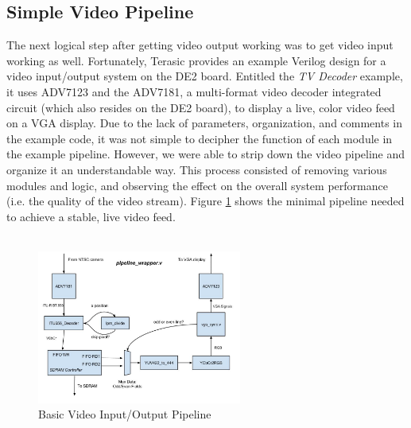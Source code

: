\documentclass[11pt]{article} %
\begin{document}
\subsection{Simple Video Pipeline}
\label{sec:pipe}
The next logical step after getting video output working was to get video input working as well. Fortunately, Terasic provides an example Verilog design for a video input/output system on the DE2 board. Entitled the \textit{TV Decoder} example, it uses ADV7123 and the ADV7181, a multi-format video decoder integrated circuit (which also resides on the DE2 board), to display a live, color video feed on a VGA display. Due to the lack of parameters, organization, and comments in the example code, it was not simple to decipher the function of each module in the example pipeline. However, we were able to strip down the video pipeline and organize it an understandable way. This process consisted of removing various modules and logic, and observing the effect on the overall system performance (i.e. the quality of the video stream). Figure \ref{fig:basicPipe} shows the minimal pipeline needed to achieve a stable, live video feed.\\\\
\FloatBarrier
\begin{figure}[h]
\centering
\includegraphics[width=0.6\textwidth]{./images/demoPipeline.jpg}
\caption{Basic Video Input/Output Pipeline}
\label{fig:basicPipe}
\end{figure}
\FloatBarrier
\end{document}
